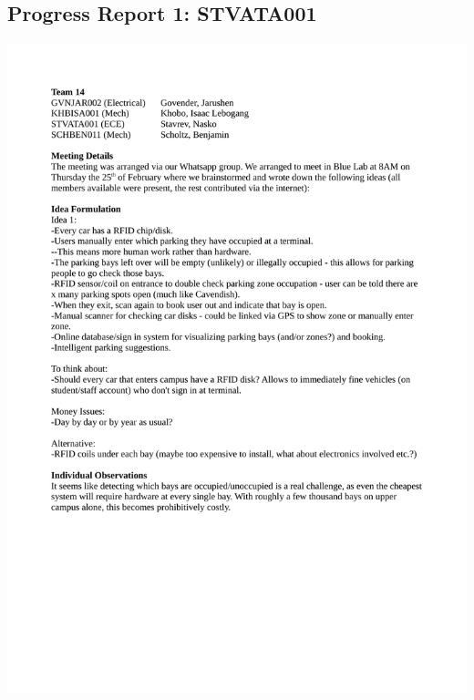 \newpage
\subsection*{Progress Report 1: STVATA001}
\includegraphics[scale=0.9]{meeting/report1-nasko.pdf}

\newpage
